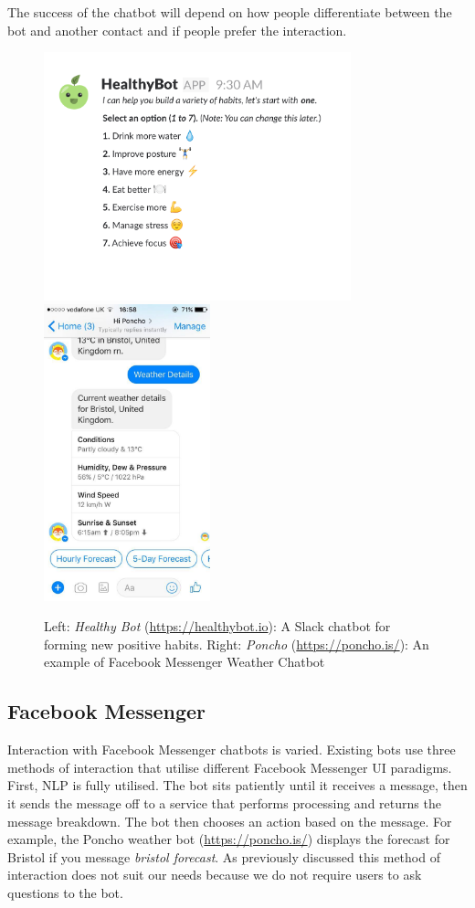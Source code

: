 The success of the chatbot will depend on how people differentiate between the bot and another contact and if people prefer the interaction.


\begin{figure}[H]
  \centering
  \includegraphics[width=3.5in]{../resources/existing-bots/healthy-bot.png}
  \hspace{10px}
  \includegraphics[width=1.9in]{../resources/existing-bots/poncho.jpg}
  \caption{Left: \textit{Healthy Bot} (\url{https://healthybot.io}): A Slack chatbot for forming new positive habits. Right: \textit{Poncho} (\url{https://poncho.is/}): An example of Facebook Messenger Weather Chatbot}
  \label{fig:healthy_bot_and_poncho}
\end{figure}


\subsection*{Facebook Messenger}

Interaction with Facebook Messenger chatbots is varied. Existing bots use three methods of interaction that utilise different Facebook Messenger UI paradigms. First, NLP is fully utilised. The bot sits patiently until it receives a message, then it sends the message off to a service that performs processing and returns the message breakdown. The bot then chooses an action based on the message. For example, the Poncho weather bot (\url{https://poncho.is/}) displays the forecast for Bristol if you message \textit{bristol forecast}. As previously discussed this method of interaction does not suit our needs because we do not require users to ask questions to the bot.



